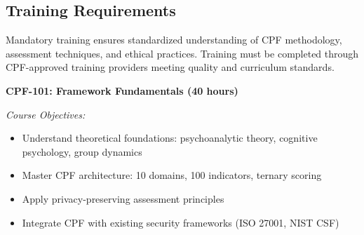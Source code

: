 \documentclass[11pt,a4paper]{article}
\begin{document}
\subsection{Training Requirements}

Mandatory training ensures standardized understanding of CPF methodology, assessment techniques, and ethical practices. Training must be completed through CPF-approved training providers meeting quality and curriculum standards.

\textbf{CPF-101: Framework Fundamentals (40 hours)}

\textit{Course Objectives:}
\begin{itemize}
\item Understand theoretical foundations: psychoanalytic theory, cognitive psychology, group dynamics
\item Master CPF architecture: 10 domains, 100 indicators, ternary scoring
\item Apply privacy-preserving assessment principles
\item Integrate CPF with existing security frameworks (ISO 27001, NIST CSF)
\end{itemize}
\end{document}
